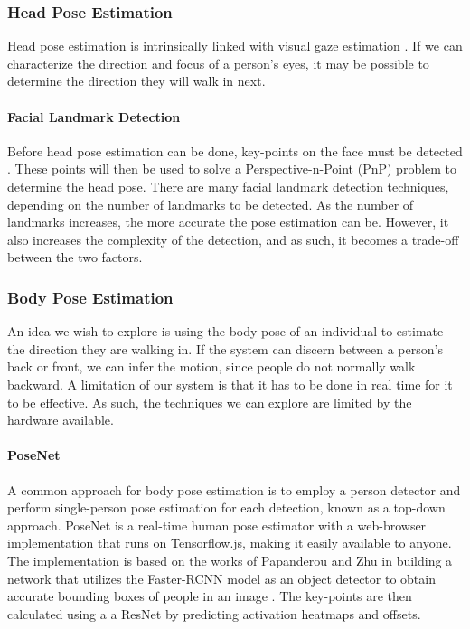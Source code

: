 \subsubsection{Head Pose Estimation} \label{sec:backHeadPoseEstimation}
Head pose estimation is intrinsically linked with visual gaze estimation \cite{Murphy-Chutorian2009}. If we can characterize the direction and focus of a person's eyes, it may be possible to determine the direction they will walk in next.

\paragraph{Facial Landmark Detection}
Before head pose estimation can be done, key-points on the face must be detected \cite{Kazemi2014}. These points will then be used to solve a Perspective-n-Point (PnP) problem to determine the head pose. There are many facial landmark detection techniques, depending on the number of landmarks to be detected. As the number of landmarks increases, the more accurate the pose estimation can be. However, it also increases the complexity of the detection, and as such, it becomes a trade-off between the two factors.

\subsubsection{Body Pose Estimation} \label{sec:backBodyPoseEstimation}
An idea we wish to explore is using the body pose of an individual to estimate the direction they are walking in. If the system can discern between a person's back or front, we can infer the motion, since people do not normally walk backward. A limitation of our system is that it has to be done in real time for it to be effective. As such, the techniques we can explore are limited by the hardware available.

\paragraph{PoseNet} A common approach for body pose estimation is to employ a person detector and perform single-person pose estimation for each detection, known as a top-down approach. PoseNet is a real-time human pose estimator with a web-browser implementation that runs on Tensorflow.js, making it easily available to anyone. The implementation is based on the works of Papanderou and Zhu \cite{Papandreou2017} in building a network that utilizes the Faster-RCNN model as an object detector to obtain accurate bounding boxes of people in an image \cite{Ren2017}. The key-points are then calculated using a a ResNet \cite{He2016} by predicting activation heatmaps and offsets.

